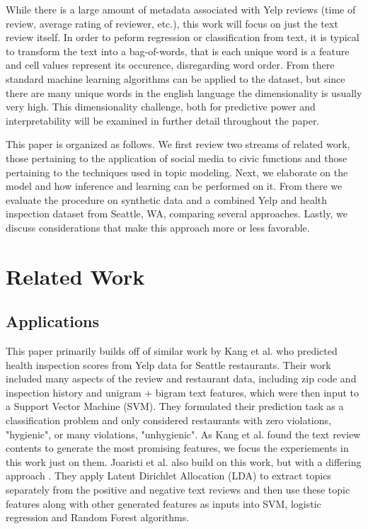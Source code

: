 \documentclass{article}
\begin{document}
While there is a large amount of metadata associated with Yelp reviews (time of review, average rating of reviewer, etc.), 
this work will focus on just the text review itself. In order to peform regression or classification from text, it is typical 
to transform the text into a bag-of-words, that is each unique word is a feature and cell values represent its occurence, 
disregarding word order. From there standard machine learning algorithms can be applied to the dataset, but since there are 
many unique words in the english language the dimensionality is usually very high. This dimensionality challenge, both for 
predictive power and interpretability will be examined in further detail 
throughout the paper.

This paper is organized as follows. We first review two streams of related work, those pertaining to the application of social
media to civic functions and those pertaining to the techniques used in topic modeling. Next, we elaborate on the model and 
how inference and learning can be performed on it. From there we evaluate the procedure on synthetic data and a combined Yelp 
and health inspection dataset from Seattle, WA, comparing several approaches. Lastly, we discuss considerations that 
make this approach more or less favorable.

\section{Related Work}

\subsection{Applications}

This paper primarily builds off of similar work by Kang et al. \cite{kang} who predicted health inspection scores from Yelp
data for Seattle restaurants. Their work included many aspects of the review and restaurant data, including zip code and 
inspection history and unigram + bigram text features, which were then input to a Support Vector Machine (SVM). They formulated their prediction task as a classification problem and only considered restaurants with zero violations, "hygienic", or many 
violations, "unhygienic". As Kang et al. found the text review contents to generate the most promising features, we focus the 
experiements in this work just on them. Joaristi et al. \cite{joaristi} also build on this work, but with a differing approach
. They apply Latent Dirichlet Allocation (LDA) to extract topics separately from the positive and negative text reviews and 
then use these topic features along with other generated features as inputs into SVM, logistic regression and Random Forest 
algorithms.
\end{document}
